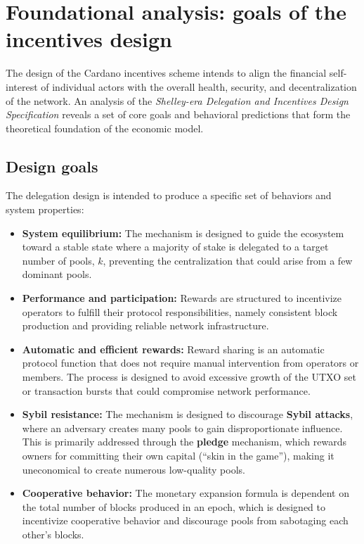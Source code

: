\documentclass[11pt, letterpaper]{article}
\begin{document}
\section{Foundational analysis: goals of the incentives design}
The design of the Cardano incentives scheme intends to align the financial
self-interest of individual actors with the overall health, security, and
decentralization of the network. An analysis of the \textit{Shelley-era
Delegation and Incentives Design Specification} reveals a set of core goals and
behavioral predictions that form the theoretical foundation of the economic
model.

\subsection{Design goals}
The delegation design is intended to produce a specific set of behaviors and
system properties:
\begin{itemize}
	\item \textbf{System equilibrium:} The mechanism is designed to guide the ecosystem toward a stable state
	      where a majority of stake is delegated to a target number of pools, \textbf{$k$}, preventing the
	      centralization that could arise from a few dominant pools.
	\item \textbf{Performance and participation:} Rewards are structured to incentivize operators to fulfill
	      their protocol responsibilities, namely consistent block production and providing reliable network
	      infrastructure.
	\item \textbf{Automatic and efficient rewards:} Reward sharing is an automatic protocol function that does
	      not require manual intervention from operators or members. The process is designed to avoid excessive
	      growth of the UTXO set or transaction bursts that could compromise network performance.
	\item \textbf{Sybil resistance:} The mechanism is designed to discourage \textbf{Sybil attacks}, where an
	      adversary creates many pools to gain disproportionate influence. This is primarily addressed through the
	      \textbf{pledge} mechanism, which rewards owners for committing their own capital (``skin in the game''),
	      making it uneconomical to create numerous low-quality pools.
	\item \textbf{Cooperative behavior:} The monetary expansion formula is dependent on the total number of
	      blocks produced in an epoch, which is designed to incentivize cooperative behavior and discourage pools
	      from sabotaging each other's blocks.
\end{itemize}
\end{document}
